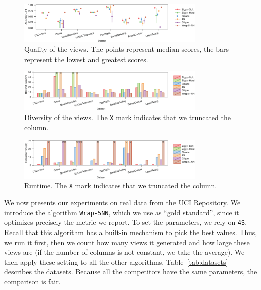 \begin{figure}[!ht]
  \centering
  \includegraphics[width=0.8\textwidth]{Plots/Real-Accuracy}
  \caption{Quality of the views. The points represent median scores, the bars
  represent the lowest and greatest scores.}
  \label{pic:realquali}
\end{figure}
\begin{figure}[!ht]
  \centering
  \includegraphics[width=0.8\textwidth]{Plots/Real-Diversity}
  \caption{Diversity of the views. The \texttt{X} mark indicates that we 
  truncated the column.}
  \label{pic:realdiversity}
\end{figure}
\begin{figure}[!ht]
  \centering
  \includegraphics[width=0.8\textwidth]{Plots/Real-Runtime}
  \caption{Runtime. The \texttt{X} mark indicates that we truncated the column.}
  \label{pic:realruntime}
\end{figure}
We now presents our experiments on real data from the UCI Repository. We
introduce the algorithm \texttt{Wrap-5NN}, which we use as ``gold standard'',
since it optimizes precisely the metric we report. To set the parameters, we
rely on \texttt{4S}. Recall that this algorithm has a built-in mechanism to
pick the best values. Thus, we run it first, then we count how many views it
generated and how large these views are (if the number of columns is not
constant, we take the average). We then apply these setting to all the other
algorithms. Table~\ref{tab:datasets} describes the datasets. Because all the
competitors have the same parameters, the comparison is fair.

